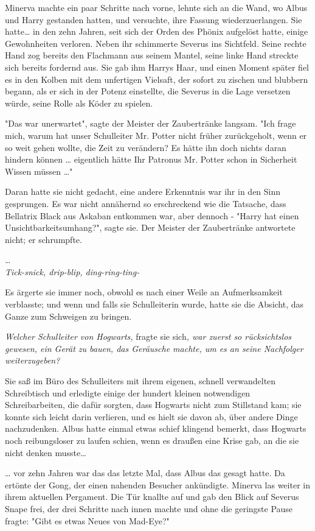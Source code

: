 {Minerva machte ein paar Schritte nach vorne, lehnte sich an die Wand, wo Albus und Harry gestanden hatten, und versuchte, ihre Fassung wiederzuerlangen. Sie hatte… in den zehn Jahren, seit sich der Orden des Phönix aufgelöst hatte, einige Gewohnheiten verloren. Neben ihr schimmerte Severus ins Sichtfeld. Seine rechte Hand zog bereits den Flachmann aus seinem Mantel, seine linke Hand streckte sich bereits fordernd aus. Sie gab ihm Harrys Haar, und einen Moment später fiel es in den Kolben mit dem unfertigen Vielsaft, der sofort zu zischen und blubbern begann, als er sich in der Potenz einstellte, die Severus in die Lage versetzen würde, seine Rolle als Köder zu spielen.

"Das war unerwartet", sagte der Meister der Zaubertränke langsam. "Ich frage mich, warum hat unser Schulleiter Mr. Potter nicht früher zurückgeholt, wenn er so weit gehen wollte, die Zeit zu verändern? Es hätte ihn doch nichts daran hindern können … eigentlich hätte Ihr Patronus Mr. Potter schon in Sicherheit Wissen müssen …"

Daran hatte sie nicht gedacht, eine andere Erkenntnis war ihr in den Sinn gesprungen. Es war nicht annähernd so erschreckend wie die Tatsache, dass Bellatrix Black aus Askaban entkommen war, aber dennoch - "Harry hat einen Unsichtbarkeitsumhang?", sagte sie. Der Meister der Zaubertränke antwortete nicht; er schrumpfte.

…\\ \emph{Tick-snick, drip-blip, ding-ring-ting-}

Es ärgerte sie immer noch, obwohl es nach einer Weile an Aufmerksamkeit verblasste; und wenn und falls sie Schulleiterin wurde, hatte sie die Absicht, das Ganze zum Schweigen zu bringen.

\emph{Welcher Schulleiter von Hogwarts,} fragte sie sich\emph{, war zuerst so rücksichtslos gewesen, ein Gerät zu bauen, das Geräusche machte, um es an seine Nachfolger weiterzugeben?}

Sie saß im Büro des Schulleiters mit ihrem eigenen, schnell verwandelten Schreibtisch und erledigte einige der hundert kleinen notwendigen Schreibarbeiten, die dafür sorgten, dass Hogwarts nicht zum Stillstand kam; sie konnte sich leicht darin verlieren, und es hielt sie davon ab, über andere Dinge nachzudenken. Albus hatte einmal etwas schief klingend bemerkt, dass Hogwarts noch reibungsloser zu laufen schien, wenn es draußen eine Krise gab, an die sie nicht denken musste…

… vor zehn Jahren war das das letzte Mal, dass Albus das gesagt hatte. Da ertönte der Gong, der einen nahenden Besucher ankündigte. Minerva las weiter in ihrem aktuellen Pergament. Die Tür knallte auf und gab den Blick auf Severus Snape frei, der drei Schritte nach innen machte und ohne die geringste Pause fragte: "Gibt es etwas Neues von Mad-Eye?"

}
